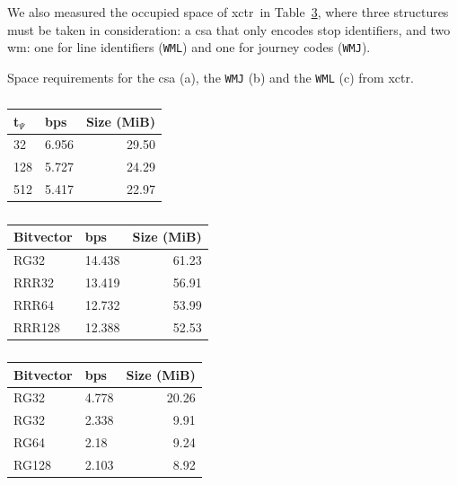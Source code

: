     We also measured the occupied space of \gls{xctr}~in Table~\ref{tab:ctr}, where three structures must be taken in consideration: a \gls{csa} that only encodes stop identifiers, and two \gls{wm}: one for line identifiers (\texttt{WML}) and one for journey codes (\texttt{WMJ}).
    
    \begin{table}
        \caption{Space requirements for the \acrlong{csa} (a), the \texttt{WMJ} (b) and the \texttt{WML} (c) from \acrshort{xctr}.}
        \label{tab:ctr}
        \begin{subtable}[t]{.28\linewidth}
        \vspace{-12pt}
        \caption{}
        \begin{tabular}[t]{|l|l|r|}
            \hline
            t$_\Psi$ & bps & Size (MiB) \\
             \hline
            32 & 6.956 & 29.50 \\
            128 & 5.727 & 24.29 \\
            512 & 5.417 & 22.97 \\
            \hline
        \end{tabular}
        \end{subtable}
        \begin{subtable}[t]{.38\linewidth}
        \vspace{-12pt}
        \caption{}
        \begin{tabular}[t]{|l|l|r|}
            \hline
            Bitvector & bps & Size (MiB) \\
             \hline
            RG32 & 14.438 & 61.23 \\
            RRR32 & 13.419 & 56.91 \\
            RRR64 & 12.732 & 53.99 \\
            RRR128 & 12.388 & 52.53 \\
            \hline
        \end{tabular}
        \end{subtable}
        \begin{subtable}[t]{.30\linewidth}
        \vspace{-12pt}
        \caption{}
        \begin{tabular}[t]{|l|l|r|}
            \hline
            Bitvector & bps & Size (MiB) \\
             \hline
            RG32 & 4.778 & 20.26 \\
            RG32 & 2.338 & 9.91 \\
            RG64 & 2.18 & 9.24 \\
            RG128 & 2.103 & 8.92 \\
            \hline
        \end{tabular}
        \end{subtable}%
    \end{table}
    
